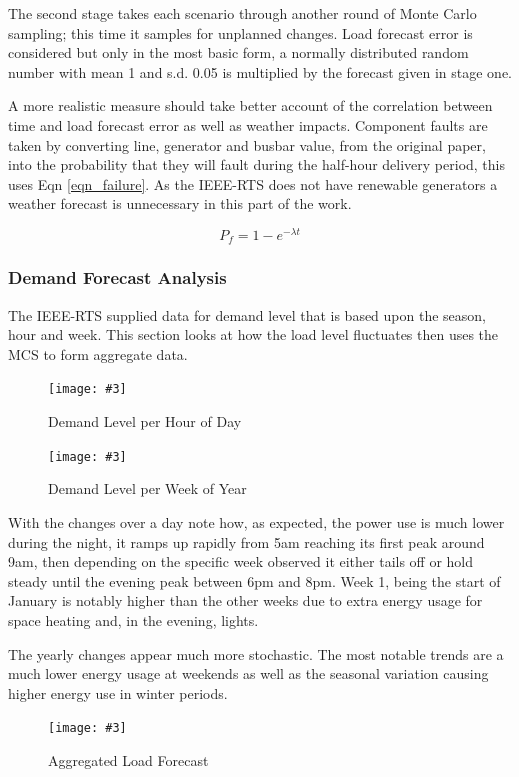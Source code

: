 \documentclass[a4paper,oneside,12pt]{report}
\newcommand{\image}[3] {
  \begin{figure}
    \begin{center}
      \texttt{[image: \#3]}
      \caption{#2}
      \label{#1}
    \end{center}
  \end{figure}
}
\begin{document}
The second stage takes each scenario through another round of Monte Carlo sampling; this time it samples for unplanned changes. Load forecast error is considered but only in the most basic form, a normally distributed random number with mean 1 and s.d. 0.05 is multiplied by the forecast given in stage one.

A more realistic measure should take better account of the correlation between time and load forecast error as well as weather impacts. Component faults are taken by converting line, generator and busbar value, from the original paper, into the probability that they will fault during the half-hour delivery period, this uses Eqn \ref{eqn_failure}. As the IEEE-RTS does not have renewable generators a weather forecast is unnecessary in this part of the work.


\begin{equation}
  \label{eqn_failure}
  P_f = {1 - e^{- \lambda t}}
\end{equation}

\subsubsection{Demand Forecast Analysis}

The IEEE-RTS supplied data for demand level that is based upon the season, hour and week. This section looks at how the load level fluctuates then uses the MCS to form aggregate data.

\image{forecastperhour}{Demand Level per Hour of Day}{forecastperhour.png}

\image{forecastperweek}{Demand Level per Week of Year}{forecastperweek.png}

With the changes over a day note how, as expected, the power use is much lower during the night, it ramps up rapidly from 5am reaching its first peak around 9am, then depending on the specific week observed it either tails off or hold steady until the evening peak between 6pm and 8pm. Week 1, being the start of January is notably higher than the other weeks due to extra energy usage for space heating and, in the evening, lights.

The yearly changes appear much more stochastic. The most notable trends are a much lower energy usage at weekends as well as the seasonal variation causing higher energy use in winter periods.

\image{aggregateforecast}{Aggregated Load Forecast}{aggregateforecast.png}
\end{document}
